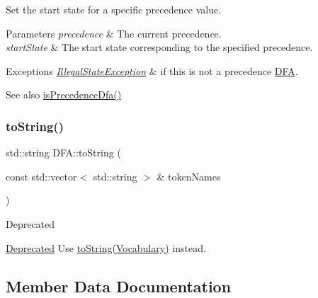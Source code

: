Set the start state for a specific precedence value.


\begin{DoxyParams}{Parameters}
{\em precedence} & The current precedence. \\
\hline
{\em start\+State} & The start state corresponding to the specified precedence.\\
\hline
\end{DoxyParams}

\begin{DoxyExceptions}{Exceptions}
{\em \hyperlink{classantlr4_1_1IllegalStateException}{Illegal\+State\+Exception}} & if this is not a precedence \hyperlink{classantlr4_1_1dfa_1_1DFA}{D\+FA}. \\
\hline
\end{DoxyExceptions}
\begin{DoxySeeAlso}{See also}
\hyperlink{classantlr4_1_1dfa_1_1DFA_a16f04e1d91f059b882505aff2174a1e1}{is\+Precedence\+Dfa()} 
\end{DoxySeeAlso}
\mbox{\label{classantlr4_1_1dfa_1_1DFA_adae4f569d3075101ae3571fe67748b56}} 
\subsubsection{\texorpdfstring{to\+String()}{toString()}}
{\footnotesize\ttfamily std\+::string D\+F\+A\+::to\+String (\begin{DoxyParamCaption}\item[{const std\+::vector$<$ std\+::string $>$ \&}]{token\+Names }\end{DoxyParamCaption})\hspace{0.3cm}{\ttfamily [virtual]}}

\begin{DoxyRefDesc}{Deprecated}
\item[\hyperlink{deprecated__deprecated000007}{Deprecated}]Use \hyperlink{}{to\+String(\+Vocabulary)} instead. \end{DoxyRefDesc}


\subsection{Member Data Documentation}
\mbox{\label{classantlr4_1_1dfa_1_1DFA_a83d51316351c6939e7d249dc20b5c9c8}} 
